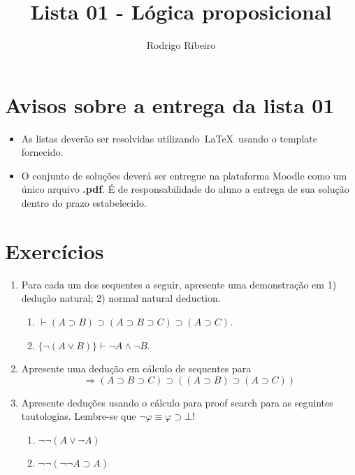 \documentclass[a4paper]{article}
\begin{document}
  \title{Lista 01 - Lógica proposicional}
  \author{Rodrigo Ribeiro}

  \maketitle


  \pagestyle{fancy}

  \section*{Avisos sobre a entrega da lista 01}

  \begin{itemize}
    \item As listas deverão ser resolvidas utilizando~\LaTeX~usando o template fornecido.
    \item O conjunto de soluções deverá ser entregue na plataforma Moodle como um único
        arquivo \textbf{.pdf}. É de responsabilidade do aluno a entrega de sua solução dentro do
        prazo estabelecido.
  \end{itemize}

  \section*{Exercícios}

  \begin{enumerate}
    \item Para cada um dos sequentes a seguir, apresente uma demonstração em 1) dedução natural; 2) normal natural deduction.
          \begin{enumerate}
            \item $\vdash (A \supset B) \supset (A \supset B \supset C) \supset (A \supset C)$.
            \item $\{\neg (A\lor B)\} \vdash \neg A \land \neg B$.
          \end{enumerate}
    \item Apresente uma dedução em cálculo de sequentes para
          \[
            \Longrightarrow (A \supset B \supset C) \supset ((A \supset B) \supset (A \supset C))
          \]

    \item Apresente deduções usando o cálculo para proof search para as seguintes tautologias.
          Lembre-se que $\neg \varphi \equiv \varphi \supset \bot$!
          \begin{enumerate}
            \item $\neg \neg (A \lor \neg A)$
            \item $\neg \neg (\neg \neg A \supset A)$
          \end{enumerate}
  \end{enumerate}
\end{document}
